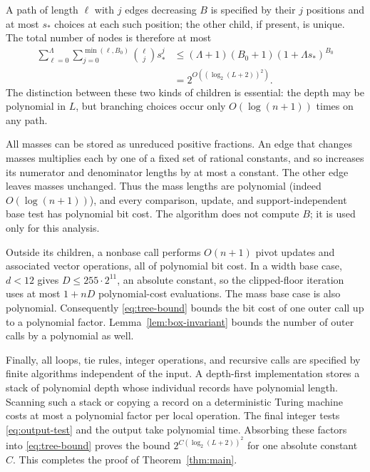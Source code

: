 A path of length $\ell$ with $j$ edges decreasing $B$ is specified by
their $j$ positions and at most $s_*$ choices at each such position;
the other child, if present, is unique. The total number of nodes is
therefore at most
\begin{align}
 \sum_{\ell=0}^{\Lambda}\sum_{j=0}^{\min(\ell,B_0)}
       \binom{\ell}{j}s_*^j
 &\le (\Lambda+1)(B_0+1)(1+\Lambda s_*)^{B_0} \\
 &=2^{O((\log_2(L+2))^2)}.
 \label{eq:tree-bound}
\end{align}
The distinction between these two kinds of children is essential:
the depth may be polynomial in $L$, but branching choices occur only
$O(\log(n+1))$ times on any path.

All masses can be stored as unreduced positive fractions. An edge that
changes masses multiplies each by one of a fixed set of rational
constants, and so increases its numerator and denominator lengths by
at most a constant. The other edge leaves masses unchanged. Thus the
mass lengths are polynomial (indeed $O(\log(n+1))$), and every comparison,
update, and support-independent base test has polynomial bit cost.
The algorithm does not compute $B$; it is used only for this analysis.

Outside its children, a nonbase call performs $O(n+1)$ pivot updates
and associated vector operations, all of polynomial bit cost. In a
width base case, $d<12$ gives $D\le255\cdot2^{11}$, an absolute
constant, so the clipped-floor iteration uses at most $1+nD$
polynomial-cost evaluations. The mass base case is also polynomial.
Consequently \eqref{eq:tree-bound} bounds the bit cost of one outer
call up to a polynomial factor. Lemma~\ref{lem:box-invariant} bounds
the number of outer calls by a polynomial as well.

Finally, all loops, tie rules, integer operations, and recursive calls
are specified by finite algorithms independent of the input. A
depth-first implementation stores a stack of polynomial depth whose
individual records have polynomial length. Scanning such a stack or
copying a record on a deterministic Turing machine costs at most a
polynomial factor per local operation. The final integer tests
\eqref{eq:output-test} and the output take polynomial time.
Absorbing these factors into \eqref{eq:tree-bound} proves the bound
$2^{C(\log_2(L+2))^2}$ for one absolute constant $C$. This completes
the proof of Theorem~\ref{thm:main}.
